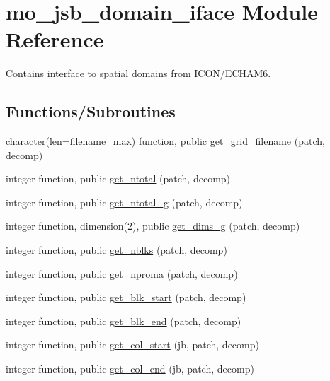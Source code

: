 \hypertarget{namespacemo__jsb__domain__iface}{}\section{mo\+\_\+jsb\+\_\+domain\+\_\+iface Module Reference}
\label{namespacemo__jsb__domain__iface}


Contains interface to spatial domains from I\+C\+O\+N/\+E\+C\+H\+A\+M6.  


\subsection*{Functions/\+Subroutines}
\begin{DoxyCompactItemize}
\item 
character(len=filename\+\_\+max) function, public \hyperlink{namespacemo__jsb__domain__iface_a6f4d6dce413ee86596fa8130c5411cbf}{get\+\_\+grid\+\_\+filename} (patch, decomp)
\item 
integer function, public \hyperlink{namespacemo__jsb__domain__iface_a937c2c8be9a4a923599e514ad683d7ed}{get\+\_\+ntotal} (patch, decomp)
\item 
integer function, public \hyperlink{namespacemo__jsb__domain__iface_a674e9ce6f4bbf62ff20c59179c0bf5e4}{get\+\_\+ntotal\+\_\+g} (patch, decomp)
\item 
integer function, dimension(2), public \hyperlink{namespacemo__jsb__domain__iface_a9420a80fdea7880fc20eab6624968038}{get\+\_\+dims\+\_\+g} (patch, decomp)
\item 
integer function, public \hyperlink{namespacemo__jsb__domain__iface_ad0a4a132184f38ef16cd49677f9ea341}{get\+\_\+nblks} (patch, decomp)
\item 
integer function, public \hyperlink{namespacemo__jsb__domain__iface_a7eb1c883deb8b5fb2250933524d1eb04}{get\+\_\+nproma} (patch, decomp)
\item 
integer function, public \hyperlink{namespacemo__jsb__domain__iface_ae4e23af6b9ee29e7b8d1a63923bd36a8}{get\+\_\+blk\+\_\+start} (patch, decomp)
\item 
integer function, public \hyperlink{namespacemo__jsb__domain__iface_afdc692d241094026338672555daf11a8}{get\+\_\+blk\+\_\+end} (patch, decomp)
\item 
integer function, public \hyperlink{namespacemo__jsb__domain__iface_a286a7d88ee91a2541b4285f22ad7c442}{get\+\_\+col\+\_\+start} (jb, patch, decomp)
\item 
integer function, public \hyperlink{namespacemo__jsb__domain__iface_abf860a70b92fa185920b6598b2e897cb}{get\+\_\+col\+\_\+end} (jb, patch, decomp)

\end{DoxyCompactItemize}
